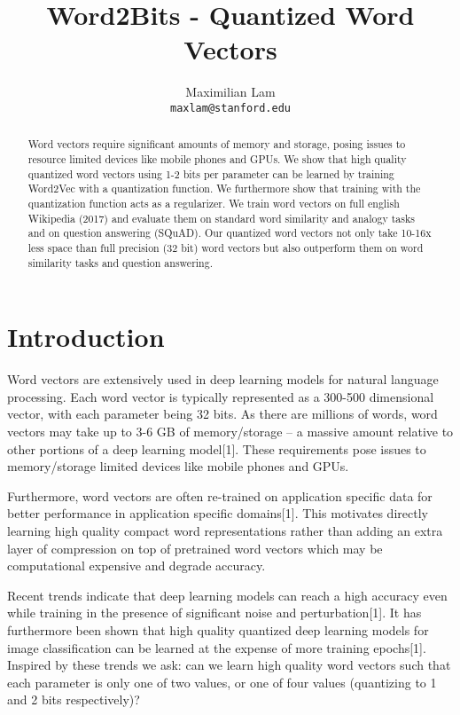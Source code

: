 \documentclass{article} %
\title{Word2Bits - Quantized Word Vectors}
\author{
Maximilian Lam\\
\texttt{maxlam@stanford.edu} \\
}
\begin{document}
\maketitle

\begin{abstract}
Word vectors require significant amounts of memory and storage, posing
issues to resource limited devices like mobile phones and GPUs. We
show that high quality quantized word vectors using 1-2 bits per
parameter can be learned by training Word2Vec with a quantization
function. We furthermore show that training with the quantization
function acts as a regularizer. We train word vectors on full english
Wikipedia (2017) and evaluate them on standard word similarity and
analogy tasks and on question answering (SQuAD). Our quantized word
vectors not only take 10-16x less space than full precision (32 bit)
word vectors but also outperform them on word similarity tasks and
question answering.
\end{abstract}

\section{Introduction}
Word vectors are extensively used in deep learning models for natural
language processing. Each word vector is typically represented as a
300-500 dimensional vector, with each parameter being 32 bits. As
there are millions of words, word vectors may take up to 3-6 GB of
memory/storage -- a massive amount relative to other portions of a
deep learning model[1]. These requirements pose issues to
memory/storage limited devices like mobile phones and GPUs.

Furthermore, word vectors are often re-trained on application specific
data for better performance in application specific domains[1]. This
motivates directly learning high quality compact word representations
rather than adding an extra layer of compression on top of pretrained
word vectors which may be computational expensive and degrade
accuracy.

Recent trends indicate that deep learning models can reach a high
accuracy even while training in the presence of significant noise and
perturbation[1]. It has furthermore been shown that high quality
quantized deep learning models for image classification can be learned
at the expense of more training epochs[1]. Inspired by these trends we
ask: can we learn high quality word vectors such that each parameter
is only one of two values, or one of four values (quantizing to 1 and
2 bits respectively)?
\end{document}
